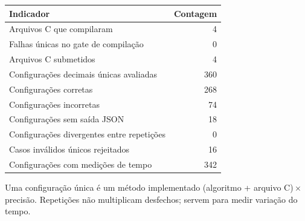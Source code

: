 \begin{tabular}{lr}
\toprule
Indicador & Contagem\\
\midrule
Arquivos C que compilaram & 4\\
Falhas únicas no gate de compilação & 0\\
Arquivos C submetidos & 4\\
Configurações decimais únicas avaliadas & 360\\
Configurações corretas & 268\\
Configurações incorretas & 74\\
Configurações sem saída JSON & 18\\
Configurações divergentes entre repetições & 0\\
Casos inválidos únicos rejeitados & 16\\
Configurações com medições de tempo & 342\\
\bottomrule
\end{tabular}
\par\smallskip\footnotesize Uma configuração única é um método implementado (algoritmo + arquivo C)\,$\times$\,precisão. Repetições não multiplicam desfechos; servem para medir variação do tempo.\normalsize
